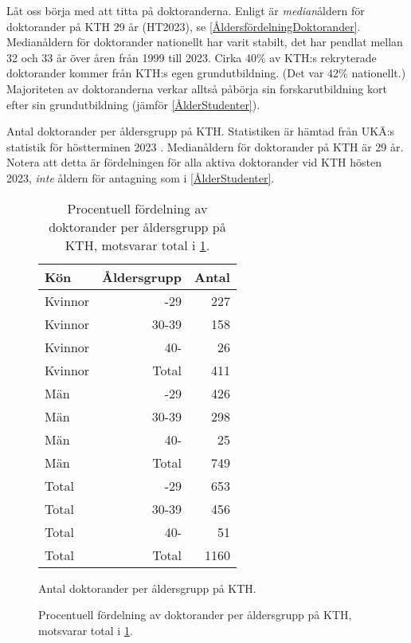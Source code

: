 \documentclass[a4paper,oneside,article,swedish]{memoir}
\begin{document}
Låt oss börja med att titta på doktoranderna.
Enligt \textcite{UKÄstat} är \emph{median}åldern för doktorander på KTH 29 år 
(HT2023), se \cref{ÅldersfördelningDoktorander}.
Medianåldern för doktorander nationellt har varit stabilt, det har pendlat 
mellan 32 och 33 år över åren från 1999 till 2023.
Cirka 40\% av KTH:s rekryterade doktorander kommer från KTH:s egen  
grundutbildning\autocite{UKÄstat}.
(Det var 42\% nationellt.)
Majoriteten av doktoranderna verkar alltså påbörja sin forskarutbildning kort 
efter sin grundutbildning (jämför \cref{ÅlderStudenter}).

\begin{table}
  \begin{sidecaption}{%
    Antal doktorander per åldersgrupp på KTH.
    Statistiken är hämtad från UKÄ:s statistik för höstterminen 2023 
    \parencite{UKÄstat}.
    Medianåldern för doktorander på KTH är 29 år.
    Notera att detta är fördelningen för alla aktiva doktorander vid KTH hösten 
    2023, \emph{inte} åldern för antagning som i \cref{ÅlderStudenter}.
  }%
  \label{ÅldersfördelningDoktorander}
  \hspace*{\fill}
  \begin{subfigure}[b]{0.45\textwidth}
    \centering
    \begin{tabular}{lrr}
      \toprule
      Kön & Åldersgrupp & Antal \\
      \midrule
      Kvinnor & -29    & 227 \\
      Kvinnor & 30-39  & 158 \\
      Kvinnor & 40-    & 26  \\
      \midrule
      Kvinnor & Total  & 411 \\
      \midrule
      Män     & -29    & 426 \\
      Män     & 30-39  & 298 \\
      Män     & 40-    & 25  \\
      \midrule
      Män     & Total  & 749 \\
      \midrule
      Total   & -29    & 653 \\
      Total   & 30-39  & 456 \\
      Total   & 40-    & 51  \\
      \midrule
      Total   & Total  & 1160 \\
      \bottomrule
    \end{tabular}
    \caption{Antal doktorander per åldersgrupp på KTH.}
    \label{ÅlderDoktorander}
  \end{subfigure}
  \hfill
  \begin{subfigure}[b]{0.45\textwidth}
    \centering
    \caption{Procentuell fördelning av doktorander per åldersgrupp på KTH, motsvarar total i \cref{ÅlderDoktorander}.}
    \label{ProcentuellÅlderDoktorander}
  \end{subfigure}
  \hspace*{\fill}
  \end{sidecaption}
\end{table}
\end{document}

